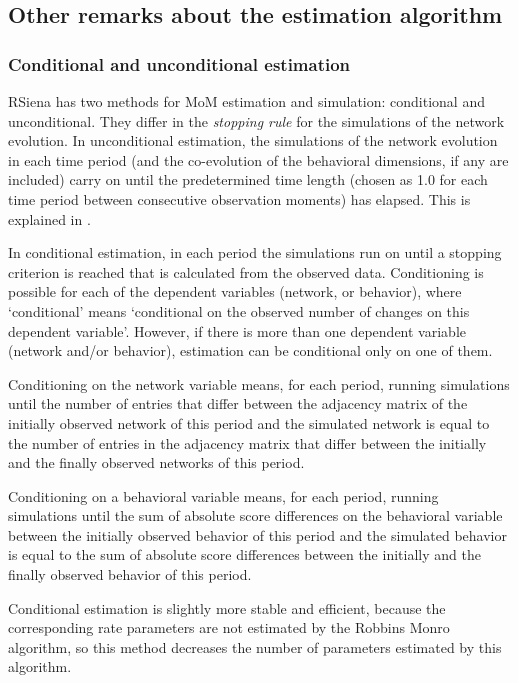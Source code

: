 \documentclass[a4paper,fleqn,11pt]{article}
\newcommand{\+}{\, + \,}
\newcommand{\RS}{{\sf \textsf{RSiena} }}
\begin{document}
\subsection{Other remarks about the estimation algorithm}

\subsubsection{Conditional and unconditional estimation}
\label{S_cond}

\RS has two methods for MoM estimation and simulation:
\hypertarget{T_S_cond}{conditional and unconditional}. They differ
in the {\em stopping rule} for the simulations of the network
evolution. In unconditional estimation, the simulations of the
network evolution in each time period (and the co-evolution of the
behavioral dimensions, if any are included) carry on until the
predetermined time length (chosen as 1.0
for each time period between consecutive observation moments) has elapsed.
This is explained in \citet[][Section 4.2]{Snijders01}.

In conditional estimation, in each period
the simulations run on until a stopping
criterion is reached that is calculated from the observed data.
Conditioning is possible for each of the dependent variables
(network, or behavior), where `conditional' means `conditional on
the observed number of changes on this dependent variable'.
However, if there is more than one dependent variable
(network and/or behavior), estimation can be conditional only
on one of them.

Conditioning on the network variable means, for each period,
running simulations until the number of entries that differ
between the adjacency matrix of the
initially observed network of this period and the simulated network
\hypertarget{T_distance_stop}{is equal to the number} of entries
in the adjacency matrix that differ between the initially and the
finally observed networks of this period.

Conditioning on a behavioral variable means, for each period, running
simulations until the sum of absolute score differences on the behavioral
variable between the initially observed behavior of this period
and the simulated behavior is equal to the sum of absolute score
differences between the initially and the finally observed
behavior of this period.

Conditional estimation is slightly more stable and efficient,
because the corresponding rate parameters are not estimated by the
Robbins Monro algorithm, so this method decreases the number of
parameters estimated by this algorithm.
\medskip
\end{document}
